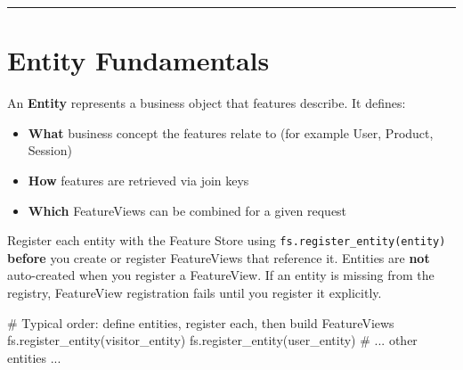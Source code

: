 \documentclass[
  letterpaper,
  DIV=11,
  numbers=noendperiod]{scrreprt}
\newenvironment{Shaded}{\begin{snugshade}}{\end{snugshade}}
\newcommand{\CommentTok}[1]{\textcolor[rgb]{0.37,0.37,0.37}{#1}}
\newcommand{\NormalTok}[1]{\textcolor[rgb]{0.00,0.23,0.31}{#1}}
\providecommand{\tightlist}{%
  \setlength{\itemsep}{0pt}\setlength{\parskip}{0pt}}\usepackage{longtable,booktabs,array}
\begin{document}
\begin{center}\rule{0.5\linewidth}{0.5pt}\end{center}

\hypertarget{entity-fundamentals}{%
\section{Entity Fundamentals}\label{entity-fundamentals}}

An \textbf{Entity} represents a business object that features describe.
It defines:

\begin{itemize}
\tightlist
\item
  \textbf{What} business concept the features relate to (for example
  User, Product, Session)
\item
  \textbf{How} features are retrieved via join keys
\item
  \textbf{Which} FeatureViews can be combined for a given request
\end{itemize}

\begin{tcolorbox}[enhanced jigsaw, title=\textcolor{quarto-callout-note-color}{\faInfo}\hspace{0.5em}{Entity registration lifecycle}, colbacktitle=quarto-callout-note-color!10!white, rightrule=.15mm, arc=.35mm, colframe=quarto-callout-note-color-frame, left=2mm, bottomtitle=1mm, toptitle=1mm, breakable, bottomrule=.15mm, opacityback=0, titlerule=0mm, toprule=.15mm, opacitybacktitle=0.6, colback=white, coltitle=black, leftrule=.75mm]

Register each entity with the Feature Store using
\texttt{fs.register\_entity(entity)} \textbf{before} you create or
register FeatureViews that reference it. Entities are \textbf{not}
auto-created when you register a FeatureView. If an entity is missing
from the registry, FeatureView registration fails until you register it
explicitly.

\end{tcolorbox}

\begin{Shaded}
\begin{Highlighting}[]
\CommentTok{\# Typical order: define entities, register each, then build FeatureViews}
\NormalTok{fs.register\_entity(visitor\_entity)}
\NormalTok{fs.register\_entity(user\_entity)}
\CommentTok{\# ... other entities ...}
\end{Highlighting}
\end{Shaded}
\end{document}
